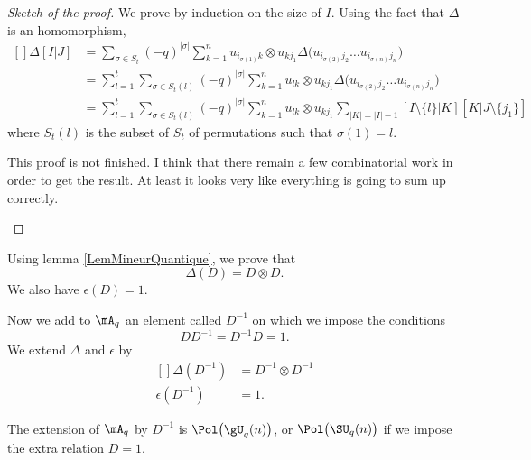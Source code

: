 \begin{proof}[Sketch of the proof]
    
    We prove by induction on the size of $I$. Using the fact that $\Delta$ is an homomorphism,
    \begin{equation}
        \begin{aligned}[]
            \Delta[I|J]&=\sum_{\sigma\in S_t}(-q)^{| \sigma |}\sum_{k=1}^nu_{i_{\sigma(1)}k}\otimes u_{kj_1}\Delta\big( u_{i_{\sigma(2)}j_2}\ldots u_{i_{\sigma(n)}j_n} \big)\\
            &=\sum_{l=1}^t\sum_{\sigma\in S_t(l)}(-q)^{| \sigma |}\sum_{k=1}^nu_{lk}\otimes u_{kj_1}\Delta\big( u_{i_{\sigma(2)}j_2}\ldots u_{i_{\sigma(n)}j_n} \big)\\
            &=\sum_{l=1}^t\sum_{\sigma\in S_t(l)}(-q)^{| \sigma |}\sum_{k=1}^nu_{lk}\otimes u_{kj_1}\sum_{| K |=| I |-1}[I\setminus\{ l \}|K][K|J\setminus\{ j_1 \}]
        \end{aligned}
    \end{equation}
    where $S_t(l)$ is the subset of $S_t$ of permutations such that $\sigma(1)=l$.

    \begin{probleme}
        This proof is not finished. I think that there remain a few combinatorial work in order to get the result. At least it looks very like everything is going to sum up correctly.
    \end{probleme}
\end{proof}

Using lemma \ref{LemMineurQuantique}, we prove that
\begin{equation}
    \Delta(D)=D\otimes D.
\end{equation}
We also have $\epsilon(D)=1$.

Now we add to $\mA_q$ an element called $D^{-1}$ on which we impose the conditions
\begin{equation}
    DD^{-1}=D^{-1}D=1.
\end{equation}
We extend $\Delta$ and $\epsilon$ by
\begin{equation}
    \begin{aligned}[]
        \Delta(D^{-1})&=D^{-1}\otimes D^{-1}\\
        \epsilon(D^{-1})&=1.
    \end{aligned}
\end{equation}

The extension of $\mA_q$ by $D^{-1}$ is $\Pol\big( \gU_q(n) \big)$, or $\Pol\big( \SU_q(n) \big)$ if we impose the extra relation $D=1$.

